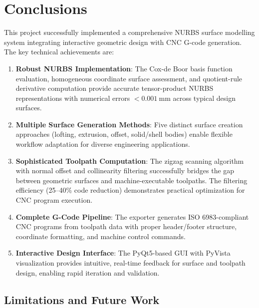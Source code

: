 \documentclass[a4paper,12pt]{article}
\begin{document}
\section{Conclusions}

This project successfully implemented a comprehensive NURBS surface modelling
system integrating interactive geometric design with CNC G-code generation.
The key technical achievements are:

\begin{enumerate}
  \item \textbf{Robust NURBS Implementation}: The Cox-de Boor basis function
    evaluation, homogeneous coordinate surface assessment, and quotient-rule
    derivative computation provide accurate tensor-product NURBS representations
    with numerical errors $< 0.001~\text{mm}$ across typical design surfaces.

  \item \textbf{Multiple Surface Generation Methods}: Five distinct surface
    creation approaches (lofting, extrusion, offset, solid/shell bodies) enable
    flexible workflow adaptation for diverse engineering applications.

  \item \textbf{Sophisticated Toolpath Computation}: The zigzag scanning
    algorithm with normal offset and collinearity filtering successfully bridges
    the gap between geometric surfaces and machine-executable toolpaths. The
    filtering efficiency (25--40\% code reduction) demonstrates practical
    optimization for CNC program execution.

  \item \textbf{Complete G-Code Pipeline}: The exporter generates ISO 6983-compliant
    CNC programs from toolpath data with proper header/footer structure,
    coordinate formatting, and machine control commands.

  \item \textbf{Interactive Design Interface}: The PyQt5-based GUI with PyVista
    visualization provides intuitive, real-time feedback for surface and
    toolpath design, enabling rapid iteration and validation.
\end{enumerate}

\subsection{Limitations and Future Work}
\end{document}
